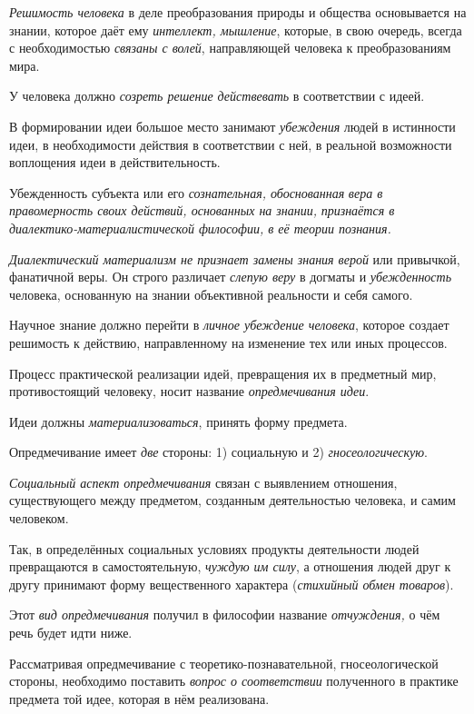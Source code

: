 \documentclass[a4paper,14pt,russian]{extreport}
\begin{document}
\emph{Решимость человека} в деле преобразования природы и общества основывается на знании, которое даёт ему \emph{интеллект, мышление}, которые, в свою очередь, всегда с необходимостью \emph{связаны с волей}, направляющей человека к преобразованиям мира.

У человека должно \emph{созреть решение действевать} в соответствии с идеей.

В формировании идеи большое место занимают \emph{убеждения} людей в истинности идеи, в необходимости действия в соответствии с ней, в реальной возможности воплощения идеи в действительность.

Убежденность субъекта или его \emph{сознательная, обоснованная} \emph{вера в правомерность своих действий, основанных на знании,} \emph{признаётся в диалектико-материалистической философии, в её теории познания.}

\emph{Диалектический материализм не признает замены знания верой} или привычкой, фанатичной веры. Он строго различает \emph{слепую веру} в догматы и \emph{убежденность} человека, основанную на знании объективной реальности и себя самого.

Научное знание должно перейти в \emph{личное убеждение человека}, которое создает решимость к действию, направленному на изменение тех или иных процессов.

Процесс практической реализации идей, превращения их в предметный мир, противостоящий человеку, носит название \emph{опредмечивания идеи}.

Идеи должны \emph{материализоваться}, принять форму предмета.

Опредмечивание имеет \emph{две} стороны: 1) социальную и 2) \emph{гносеологическую}.

\emph{Социальный аспект опредмечивания} связан с выявлением отношения, существующего между предметом, созданным деятельностью человека, и самим человеком.

Так, в определённых социальных условиях продукты деятельности людей превращаются в самостоятельную, \emph{чуждую им силу}, а отношения людей друг к другу принимают форму вещественного характера (\emph{стихийный обмен товаров}).

Этот \emph{вид опредмечивания} получил в философии название \emph{отчуждения,} о чём речь будет идти ниже.

Рассматривая опредмечивание с теоретико-познавательной, гносеологической стороны, необходимо поставить \emph{вопрос о соответствии} полученного в практике предмета той идее, которая в нём реализована.
\end{document}
